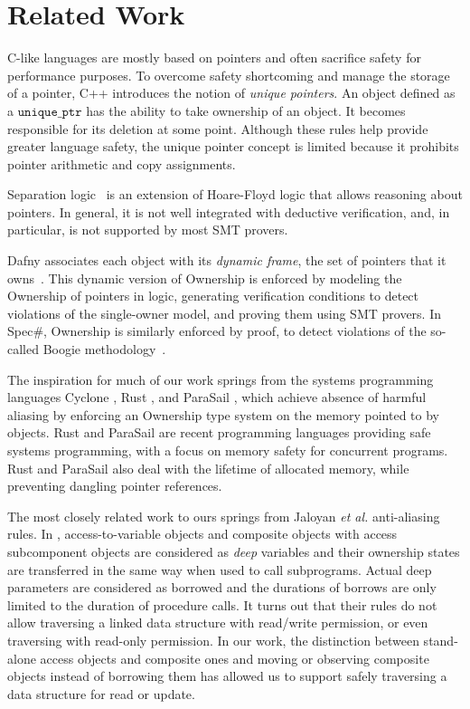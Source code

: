 \documentclass[runningheads]{llncs}
\newcommand\var[1]{\ensuremath{\mathtt{#1}}}
\begin{document}
\section{Related Work}

C-like languages are mostly based on pointers and often sacrifice safety for performance purposes.
To overcome safety shortcoming and manage the storage of a pointer, C++ introduces the notion of \textit{unique pointers}. An object defined as a \var{unique\_ptr}
has the ability to take ownership of an object. It becomes responsible for its deletion at some point. Although these rules help provide greater language safety, the unique
pointer concept is limited because it prohibits pointer arithmetic and copy assignments.

Separation logic~\cite{Reynolds02} is an extension of Hoare-Floyd logic that allows reasoning about pointers. In general, it is not well integrated with deductive
verification, and, in particular, is not supported by most SMT provers.


Dafny associates each object with its \emph{dynamic frame}, the set of pointers that it owns~\cite{Leino10}. This dynamic version of Ownership is
enforced by modeling the Ownership of pointers in logic, generating verification conditions to detect violations of the single-owner model, and proving
them using SMT provers. In Spec\#, Ownership is similarly enforced by proof, to detect violations of the so-called Boogie methodology~\cite{Boogie}.

The inspiration for much of our work springs from the systems programming languages Cyclone \cite{Grossman2002}, Rust \cite{Balasubramanian17}, and ParaSail \cite{Taft11}, which achieve absence of
harmful aliasing by enforcing an Ownership type system on the memory pointed to by objects. Rust and ParaSail are recent programming languages providing safe systems
programming, with a focus on memory safety for concurrent programs.
Rust and ParaSail also deal with the lifetime of allocated memory, while preventing dangling pointer references.

The most closely related work to ours springs from Jaloyan \textit{et al.} \cite{Jaloyan18} anti-aliasing rules. In \cite{Jaloyan18}, access-to-variable objects
and composite objects with access subcomponent objects are considered as \textit{deep} variables and their ownership states are transferred in the same way when used to call subprograms.
Actual deep parameters are considered as borrowed and the durations of borrows are only limited to the duration of procedure calls.
It turns out that their rules do not allow traversing a linked data structure with read/write permission, or even traversing with read-only permission. In our work, the distinction between stand-alone access
objects and composite ones and moving or observing composite objects instead of borrowing them has allowed us to support safely traversing a data structure for read or update.
\end{document}
